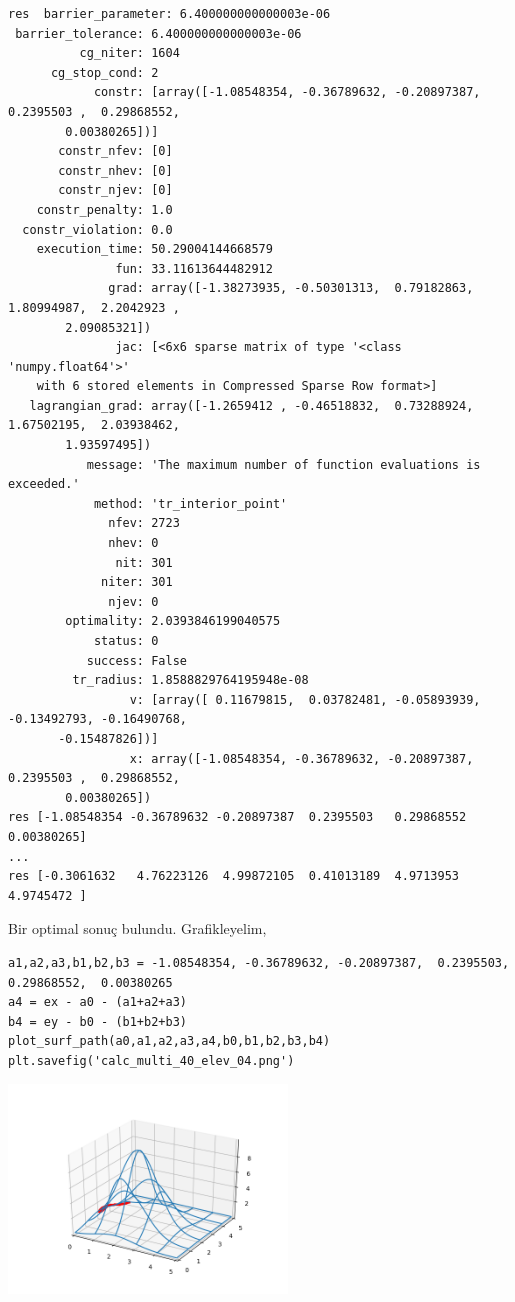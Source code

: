 \documentclass[12pt,fleqn]{article}\usepackage{../../common}
\begin{document}
\begin{verbatim}
res  barrier_parameter: 6.400000000000003e-06
 barrier_tolerance: 6.400000000000003e-06
          cg_niter: 1604
      cg_stop_cond: 2
            constr: [array([-1.08548354, -0.36789632, -0.20897387,  0.2395503 ,  0.29868552,
        0.00380265])]
       constr_nfev: [0]
       constr_nhev: [0]
       constr_njev: [0]
    constr_penalty: 1.0
  constr_violation: 0.0
    execution_time: 50.29004144668579
               fun: 33.11613644482912
              grad: array([-1.38273935, -0.50301313,  0.79182863,  1.80994987,  2.2042923 ,
        2.09085321])
               jac: [<6x6 sparse matrix of type '<class 'numpy.float64'>'
	with 6 stored elements in Compressed Sparse Row format>]
   lagrangian_grad: array([-1.2659412 , -0.46518832,  0.73288924,  1.67502195,  2.03938462,
        1.93597495])
           message: 'The maximum number of function evaluations is exceeded.'
            method: 'tr_interior_point'
              nfev: 2723
              nhev: 0
               nit: 301
             niter: 301
              njev: 0
        optimality: 2.0393846199040575
            status: 0
           success: False
         tr_radius: 1.8588829764195948e-08
                 v: [array([ 0.11679815,  0.03782481, -0.05893939, -0.13492793, -0.16490768,
       -0.15487826])]
                 x: array([-1.08548354, -0.36789632, -0.20897387,  0.2395503 ,  0.29868552,
        0.00380265])
res [-1.08548354 -0.36789632 -0.20897387  0.2395503   0.29868552  0.00380265]
...
res [-0.3061632   4.76223126  4.99872105  0.41013189  4.9713953   4.9745472 ]
\end{verbatim}

Bir optimal sonuç bulundu. Grafikleyelim,

\begin{verbatim}
a1,a2,a3,b1,b2,b3 = -1.08548354, -0.36789632, -0.20897387,  0.2395503,   0.29868552,  0.00380265
a4 = ex - a0 - (a1+a2+a3)
b4 = ey - b0 - (b1+b2+b3)
plot_surf_path(a0,a1,a2,a3,a4,b0,b1,b2,b3,b4)
plt.savefig('calc_multi_40_elev_04.png')
\end{verbatim}

\includegraphics[width=20em]{calc_multi_40_elev_04.png}
\end{document}
